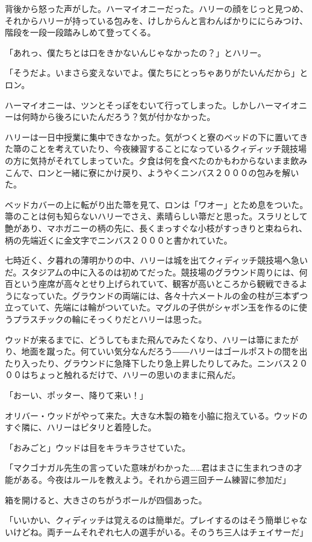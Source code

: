 \documentclass[10pt,a4paper]{article}
\begin{document}
\begin{CJK}{UTF8}{min}
背後から怒った声がした。ハーマイオニーだった。ハリーの顔をじっと見つめ、それからハリーが持っている包みを、けしからんと言わんばかりににらみつけ、階段を一段一段踏みしめて登ってくる。

「あれっ、僕たちとは口をきかないんじゃなかったの？」とハリー。

「そうだよ。いまさら変えないでよ。僕たちにとっちゃありがたいんだから」とロン。

ハーマイオニーは、ツンとそっぽをむいて行ってしまった。しかしハーマイオニーは何時から後ろにいたんだろう？気が付かなかった。

ハリーは一日中授業に集中できなかった。気がつくと寮のベッドの下に置いてきた箒のことを考えていたり、今夜練習することになっているクィディッチ競技場の方に気持がそれてしまっていた。夕食は何を食べたのかもわからないまま飲みこんで、ロンと一緒に寮にかけ戻り、ようやくニンバス２０００の包みを解いた。

ベッドカバーの上に転がり出た箒を見て、ロンは「ワオー」とため息をついた。箒のことは何も知らないハリーでさえ、素晴らしい箒だと思った。スラリとして艶があり、マホガニーの柄の先に、長くまっすぐな小枝がすっきりと束ねられ、柄の先端近くに金文字でニンバス２０００と書かれていた。

七時近く、夕暮れの薄明かりの中、ハリーは城を出てクィディッチ競技場へ急いだ。スタジアムの中に入るのは初めてだった。競技場のグラウンド周りには、何百という座席が高々とせり上げられていて、観客が高いところから観戦できるようになっていた。グラウンドの両端には、各々十六メートルの金の柱が三本ずつ立っていて、先端には輪がついていた。マグルの子供がシャボン玉を作るのに使うプラスチックの輪にそっくりだとハリーは思った。

ウッドが来るまでに、どうしてもまた飛んでみたくなり、ハリーは箒にまたがり、地面を蹴った。何ていい気分なんだろう――ハリーはゴールポストの間を出たり入ったり、グラウンドに急降下したり急上昇したりしてみた。ニンバス２０００はちょっと触れるだけで、ハリーの思いのままに飛んだ。

「おーい、ポッター、降りて来い！」

オリバー・ウッドがやって来た。大きな木製の箱を小脇に抱えている。ウッドのすぐ隣に、ハリーはピタリと着陸した。

「おみごと」ウッドは目をキラキラさせていた。

「マクゴナガル先生の言っていた意味がわかった……君はまさに生まれつきの才能がある。今夜はルールを教えよう。それから週三回チーム練習に参加だ」

箱を開けると、大きさのちがうボールが四個あった。

「いいかい、クィディッチは覚えるのは簡単だ。プレイするのはそう簡単じゃないけどね。両チームそれぞれ七人の選手がいる。そのうち三人はチェイサーだ」


\end{CJK}
\end{document}
